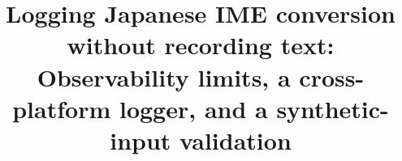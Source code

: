 \documentclass[pdflatex,sn-apa,referee]{sn-jnl}
\newcommand{\tbd}[1]{\textbf{[#1]}}
\newcommand{\rv}[1]{\ifcsname rv:#1\endcsname\csname rv:#1\endcsname\else\tbd{#1}%
  \PackageWarningNoLine{results}{Result value #1 not generated}\fi}
\begin{document}
\title{Logging Japanese IME conversion without recording text: Observability limits, a cross-platform logger, and a
synthetic-input validation}

\renewcommand{\orcidlogo}{(ORCID 0009-0000-4196-0508)}
\author*[1]{ ~}

\end{document}
